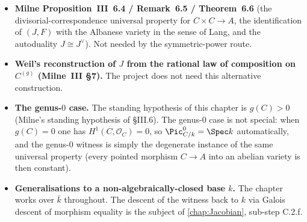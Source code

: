 \begin{itemize}
    was excised from the project in iter-163; the autoduality / moduli
    route is therefore demoted and replaced by the symmetric-power route
    of this chapter. A reference recording of the moduli wording is given
    in the ``Alternative route history'' \texttt{\%~NOTE} block at the end
    of this file.
  \item \textbf{Milne Proposition~III~6.4 / Remark~6.5 / Theorem~6.6} (the
    divisorial-correspondence universal property for \(C \times C \to A\),
    the identification of \((J, F)\) with the Albanese variety in the sense
    of Lang, and the autoduality \(J \cong J^\vee\)). Not needed by the
    symmetric-power route.
  \item \textbf{Weil's reconstruction of \(J\) from the rational law of
    composition on \(C^{(g)}\) (Milne~III \S 7).} The project does not need
    this alternative construction.
  \item \textbf{The genus-\(0\) case.} The standing hypothesis of this chapter
    is \(g(C) > 0\) (Milne's standing hypothesis of \S III.6). The genus-\(0\)
    case is not special: when \(g(C) = 0\) one has \(H^1(C, \mathcal O_C) = 0\),
    so \(\Pic^0_{C/k} = \Spec k\) automatically, and the genus-\(0\) witness is
    simply the degenerate instance of the same universal property (every pointed
    morphism \(C \to A\) into an abelian variety is then constant).
  \item \textbf{Generalisations to a non-algebraically-closed base \(k\).}
    The chapter works over \(\bar k\) throughout. The descent of the witness
    back to \(k\) via Galois descent of morphism equality is the subject of
    \cref{chap:Jacobian}, sub-step C.2.f.
\end{itemize}

